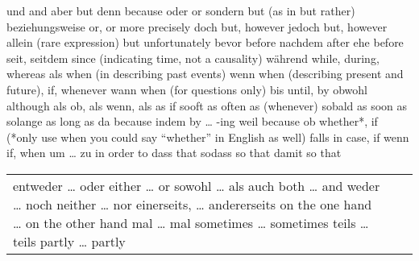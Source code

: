 \documentclass[a4paper,twocolumn,10pt]{article}
\newcommand{\tabularxtable}[3]
{

	\vspace{0.5cm}
	\nolinenumbers

	\begin{tabularx}{#1}{#2}
		#3
	\end{tabularx}

	\linenumbers
	\vspace{0.5cm}
}
\begin{document}
{und 	and
aber 	but
denn 	because
oder 	or
sondern 	but (as in but rather)
beziehungsweise 	or, or more precisely
doch 	but, however
jedoch 	but, however
allein (rare expression) 	but unfortunately
bevor 	before
nachdem 	after
ehe 	before
seit, seitdem 	since (indicating time, not a causality)
während 	while, during, whereas
als 	when (in describing past events)
wenn 	when (describing present and future), if, whenever
wann 	when (for questions only)
bis 	until, by
obwohl 	although
als ob, als wenn, als 	as if
sooft 	as often as (whenever)
sobald 	as soon as
solange 	as long as
da 	because
indem 	by … -ing
weil 	because
ob 	whether*, if (*only use when you could say “whether” in English as well)
falls 	in case, if
wenn 	if, when
um … zu 	in order to
dass 	that
sodass 	so that
damit 	so that
}



\tabularxtable
{0.99\linewidth}
{llX}
{
entweder … oder 	either … or
sowohl … als auch 	both … and
weder … noch 	neither … nor
einerseits, … andererseits 	on the one hand … on the other hand
mal … mal 	sometimes … sometimes
teils … teils 	partly … partly

}



\tabularxtable
{0.99\linewidth}
{llX}
{


}


\end{document}
